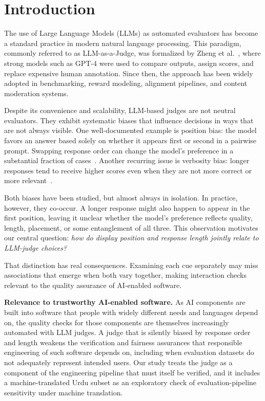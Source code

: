\documentclass[10pt,conference]{IEEEtran}
\begin{document}
\section{Introduction}
The use of Large Language Models (LLMs) as automated evaluators has become a standard practice in modern natural language processing. This paradigm, commonly referred to as LLM-as-a-Judge, was formalized by Zheng et al.~\cite{zheng2023judging}, where strong models such as GPT-4 were used to compare outputs, assign scores, and replace expensive human annotation. Since then, the approach has been widely adopted in benchmarking, reward modeling, alignment pipelines, and content moderation systems.

Despite its convenience and scalability, LLM-based judges are not neutral evaluators. They exhibit systematic biases that influence decisions in ways that are not always visible. One well-documented example is position bias: the model favors an answer based solely on whether it appears first or second in a pairwise prompt. Swapping response order can change the model's preference in a substantial fraction of cases~\cite{wang2024fair}. Another recurring issue is verbosity bias: longer responses tend to receive higher scores even when they are not more correct or more relevant~\cite{dubois2025lc}.

Both biases have been studied, but almost always in isolation. In practice, however, they co-occur. A longer response might also happen to appear in the first position, leaving it unclear whether the model's preference reflects quality, length, placement, or some entanglement of all three. This observation motivates our central question: \emph{how do display position and response length jointly relate to LLM-judge choices?}

That distinction has real consequences. Examining each cue separately may miss associations that emerge when both vary together, making interaction checks relevant to the quality assurance of AI-enabled software.

\textbf{Relevance to trustworthy AI-enabled software.} As AI components are built into software that people with widely different needs and languages depend on, the quality checks for those components are themselves increasingly automated with LLM judges. A judge that is silently biased by response order and length weakens the verification and fairness assurances that responsible engineering of such software depends on, including when evaluation datasets do not adequately represent intended users. Our study treats the judge as a component of the engineering pipeline that must itself be verified, and it includes a machine-translated Urdu subset as an exploratory check of evaluation-pipeline sensitivity under machine translation.
\end{document}
